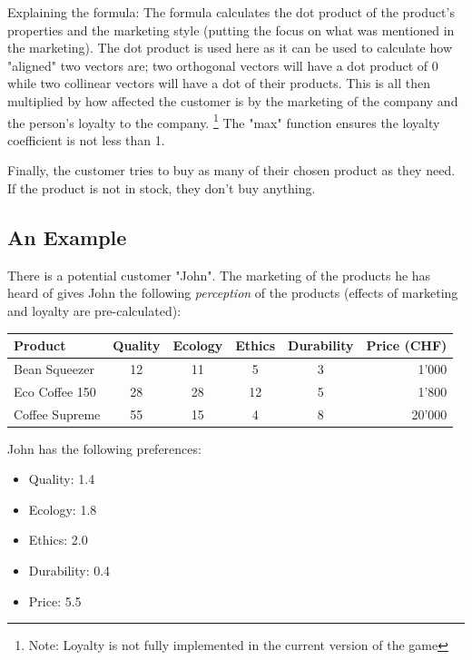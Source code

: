 {\small Explaining the formula: The formula calculates the dot product of the product's properties and the marketing style
(putting the focus on what was mentioned in the marketing). The dot product is used here as it can be used to calculate
how "aligned" two vectors are; two orthogonal vectors will have a dot product of 0 while two collinear vectors will have
a dot of their products. This is all then multiplied by how affected the customer is by the marketing of the company and the
person's loyalty to the company. \footnote{
	Note: Loyalty is not fully implemented in the current version of the game} The "max" function ensures the loyalty coefficient is not less than 1.
}

Finally, the customer tries to buy as many of their chosen product as they need. If the product is not in stock, they
don't buy anything.

\subsection{An Example}

There is a potential customer "John". The marketing of the products he has heard of gives John the following \textit{perception} of the
products (effects of marketing and loyalty are pre-calculated):

\begin{table}[h]
	\centering
	\begin{tabular}{l c c c c r}
		\toprule
		Product        & Quality & Ecology & Ethics & Durability & Price (CHF) \\ \midrule
		Bean Squeezer  & 12      & 11      & 5      & 3          & 1'000       \\
		Eco Coffee 150 & 28      & 28      & 12     & 5          & 1'800       \\
		Coffee Supreme & 55      & 15      & 4      & 8          & 20'000      \\ \bottomrule
	\end{tabular}
\end{table}

John has the following preferences:

\begin{itemize}
	\item Quality: 1.4
	\item Ecology: 1.8
	\item Ethics: 2.0
	\item Durability: 0.4
	\item Price: 5.5
\end{itemize}

